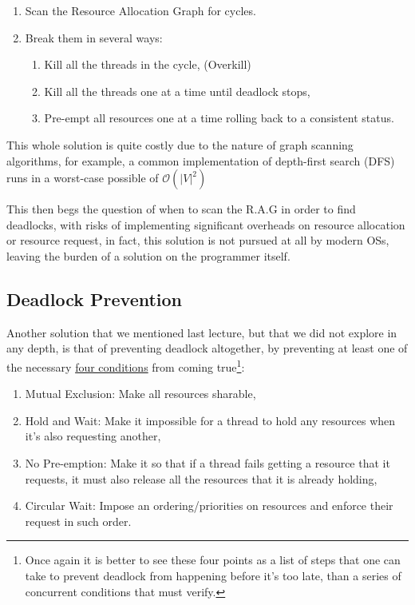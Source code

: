 \documentclass[openright, twoside]{report}
\theoremstyle{definition}
\theoremstyle{example}
\begin{document}
\begin{enumerate}
	\item Scan the Resource Allocation Graph for cycles.
	\item Break them in several ways:
	\begin{enumerate}
		\item Kill all the threads in the cycle, (Overkill)
		\item Kill all the threads one at a time until deadlock stops,
		\item Pre-empt all resources one at a time rolling back to a 
		consistent status.
	\end{enumerate}
\end{enumerate}

This whole solution is quite costly due to the nature of graph scanning algorithms, 
for example, a common implementation of depth-first search (DFS) runs in a worst-case possible 
of $\mathcal{O}(|V|^2)$

This then begs the question of when to scan the R.A.G in order to find deadlocks, with risks of 
implementing significant overheads on resource allocation or resource request, in fact, this 
solution is not pursued at all by modern OSs, leaving the burden of a solution on the programmer itself.

\subsection{Deadlock Prevention}
Another solution that we mentioned last lecture, but that we did not explore in any depth, is that 
of preventing deadlock altogether, by preventing at least one of the necessary \hyperref[ssec:deadlock_conditions]{four conditions}
from coming true\footnote{Once again it is better to see these four points as a list of steps that one can take 
to prevent deadlock from happening before it's too late, than a series of concurrent conditions that must verify.}:

\begin{enumerate}
	\item Mutual Exclusion: Make all resources sharable,
	\item Hold and Wait: Make it impossible for a thread to hold any resources when it's also requesting another,
	\item No Pre-emption: Make it so that if a thread fails getting a resource that it requests, it must also 
	release all the resources that it is already holding,
	\item Circular Wait: Impose an ordering/priorities on resources and enforce their request in such order.
\end{enumerate}
\end{document}

